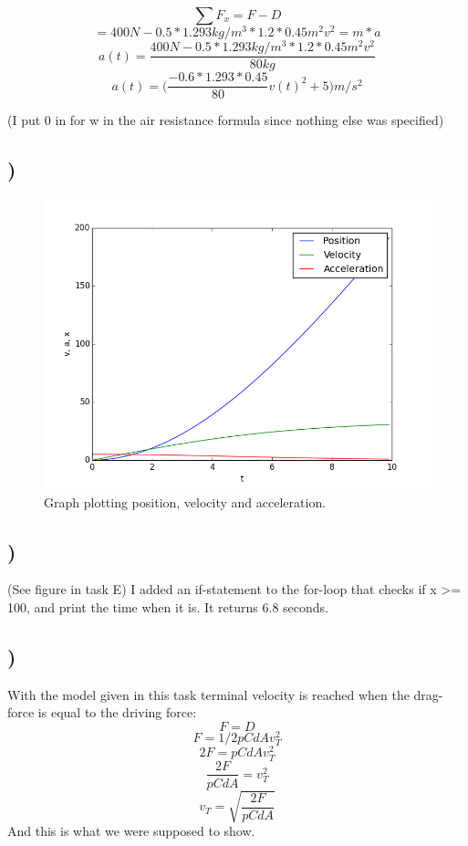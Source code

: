 \documentclass[a4paper,10pt,norsk]{article}
\begin{document}
 \[\sum F_{x} = F - D\]
 \[= 400N - 0.5*1.293kg/m^{3}*1.2*0.45m^{2}v^{2} = m * a\]
 \[a(t) = \frac{400N - 0.5*1.293kg/m^{3}*1.2*0.45m^{2}v^{2}}{80kg}\]
 \[a(t) = \bigg( \frac{-0.6 * 1.293 * 0.45}{80}v(t)^{2} + 5 \bigg) m/s^{2}\]
 
 (I put 0 in for w in the air resistance formula since nothing else was specified)
 
 \subsection{)}
 
 \begin{figure}[h!]
        \centering 
        \includegraphics[scale=0.5]{taskE.png} 
        \caption{Graph plotting position, velocity and acceleration.}
\end{figure}
 
 
 
 \subsection{)}
 (See figure in task E) I added an if-statement to the for-loop that checks if x >= 100, and print the time when it is.
 It returns 6.8 seconds.
 
 \subsection{)}
  With the model given in this task terminal velocity is reached when the drag-force is equal to the driving force:
  \[F = D\]
  \[F = 1/2pCdAv^{2}_{T}\]
  \[2F = pCdAv^{2}_{T}\]
  \[\frac{2F}{pCdA} = v^{2}_{T}\]
  \[v_{T} = \sqrt{\frac{2F}{pCdA}}\]
 And this is what we were supposed to show.
 
\end{document}
